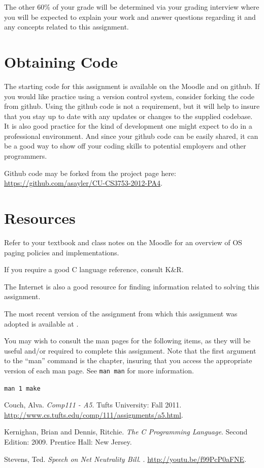 \documentclass[12pt]{article}
\newenvironment{packed_item}{
\begin{itemize}
  \setlength{\itemsep}{1pt}
  \setlength{\parskip}{0pt}
  \setlength{\parsep}{0pt}
}{\end{itemize}}
\begin{document}
The other 60\% of your grade will be determined via your grading
interview where you will be expected to explain your work and answer
questions regarding it and any concepts related to this assignment.

\section{Obtaining Code}
The starting code for this assignment is available on the Moodle and
on github. If you would like practice using a version control system,
consider forking the code from github. Using the github code is not
a requirement, but it will help to insure that you stay up to date
with any updates or changes to the supplied codebase. It is also
good practice for the kind of development one might expect to do in
a professional environment. And since your github code can be easily
shared, it can be a good way to show off your coding skills to
potential employers and other programmers.

Github code may be forked from the project page here:\\
\url{https://github.com/asayler/CU-CS3753-2012-PA4}.

\section{Resources}
Refer to your textbook and class notes on the Moodle for an overview
of OS paging policies and implementations.

If you require a good C language reference, consult K\&R\cite{K+R}.

The Internet\cite{tubes} is also a good resource for finding
information related to solving this assignment.

The most recent version of the assignment from which this assignment
was adopted is available at \cite{couch-a5}.

You may wish to consult the man pages for the following items, as they
will be useful and/or required to complete this assignment. Note that
the first argument to the ``man'' command is the chapter, insuring
that you access the appropriate version of each man page. See
\texttt{man man} for more information.

\begin{packed_item}
\item \texttt{man 1 make}
\end{packed_item}

\begin{thebibliography}{9}

 Couch, Alva.
  \newblock \emph{Comp111 - A5}.
  \newblock Tufts University: Fall 2011.
  \newblock \url{http://www.cs.tufts.edu/comp/111/assignments/a5.html}.

 Kernighan, Brian and Dennis, Ritchie.
  \newblock \emph{The C Programming Language}.
  \newblock Second Edition: 2009.
  \newblock Prentice Hall: New Jersey.

 Stevens, Ted.
  \newblock \emph{Speech on Net Neutrality Bill}.
  .
  \newblock \url{http://youtu.be/f99PcP0aFNE}.

\end{thebibliography}
\end{document}
